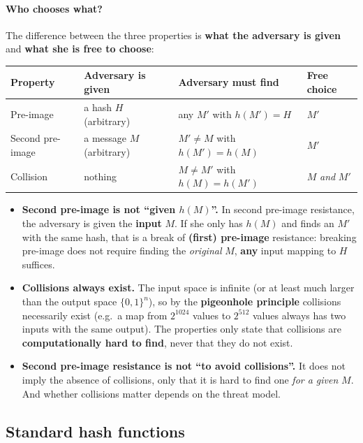 \paragraph{Who chooses what?} The difference between the three properties is \textbf{what the adversary is given} and \textbf{what she is free to choose}:
\begin{center}
\begin{tabular}{@{}llll@{}}
\toprule
\textbf{Property} & \textbf{Adversary is given} & \textbf{Adversary must find} & \textbf{Free choice} \\
\midrule
Pre-image & a hash $H$ (arbitrary) & any $M'$ with $h(M') = H$ & $M'$ \\
Second pre-image & a message $M$ (arbitrary) & $M' \neq M$ with $h(M') = h(M)$ & $M'$ \\
Collision & nothing & $M \neq M'$ with $h(M) = h(M')$ & $M$ \emph{and} $M'$ \\
\bottomrule
\end{tabular}
\end{center}

\begin{remark}
\begin{itemize}
    \item \textbf{Second pre-image is not ``given $h(M)$''.} In second pre-image resistance, the adversary is given the \textbf{input} $M$. If she only has $h(M)$ and finds an $M'$ with the same hash, that is a break of \textbf{(first) pre-image} resistance: breaking pre-image does not require finding the \emph{original} $M$, \textbf{any} input mapping to $H$ suffices.
    \item \textbf{Collisions always exist.} The input space is infinite (or at least much larger than the output space $\{0,1\}^n$), so by the \textbf{pigeonhole principle} collisions necessarily exist (e.g.\ a map from $2^{1024}$ values to $2^{512}$ values always has two inputs with the same output). The properties only state that collisions are \textbf{computationally hard to find}, never that they do not exist.
    \item \textbf{Second pre-image resistance is not ``to avoid collisions''.} It does not imply the absence of collisions, only that it is hard to find one \emph{for a given} $M$. And whether collisions matter depends on the threat model.
\end{itemize}
\end{remark}

\subsection{Standard hash functions}


